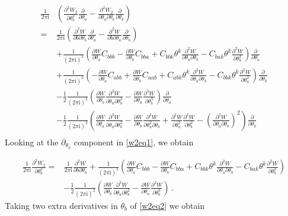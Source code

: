 \documentclass{article}
\theoremstyle{definition}
\numberwithin{equation}{section}
\begin{document}
\begin{equation}\label{w2eq1}
    \begin{split}
        \frac{1}{2\pi \mathrm{i}}&\left(\frac{\partial^2W_2}{\partial\theta_b^2}\frac{\partial}{\partial \theta_a}-\frac{\partial^2 W_2}{\partial \theta_a\partial\theta_b}\frac{\partial}{\partial \theta_b}\right)\\
        =&\frac{1}{2\pi \mathrm{i}}\left(\frac{\partial^2W}{\partial b\partial\theta_b}\frac{\partial}{\partial \theta_a}-\frac{\partial^2 W}{\partial b\partial \theta_a}\frac{\partial}{\partial \theta_b}\right)\\
        &+\frac{1}{(2\pi\mathrm{i})^2}\left(\frac{\partial W}{\partial \theta_a}C_{bbb}-\frac{\partial W}{\partial \theta_b}C_{bba}+C_{bbk}\theta^k\frac{\partial^2W}{\partial \theta_a\partial \theta_b}-C_{bak}\theta^k\frac{\partial^2W}{\partial \theta_b^2}\right)\frac{\partial}{\partial \theta_a}\\
        &+\frac{1}{(2\pi\mathrm{i})^2}\left(-\frac{\partial W}{\partial \theta_a}C_{abb}+\frac{\partial W}{\partial \theta_b}C_{aab}+C_{abk}\theta^k\frac{\partial^2W}{\partial \theta_a\partial \theta_b}-C_{bbk}\theta^k\frac{\partial^2W}{\partial \theta_a^2}\right)\frac{\partial}{\partial \theta_b}\\
        &-\frac{1}{2}\frac{1}{(2\pi\mathrm{i})^2}\left(\frac{\partial W}{\partial \theta_{b}}\frac{\partial^3 W}{\partial \theta_a \partial \theta_b^2}- \frac{\partial W}{\partial \theta_{a}}\frac{\partial^3 W}{ \partial \theta_b^3}\right)\frac{\partial}{\partial \theta_a}\\
    &-\frac{1}{2}\frac{1}{(2\pi\mathrm{i})^2}\left(\frac{\partial W}{\partial \theta_a}\frac{\partial^3W}{\partial \theta_a \partial \theta_b^2}- \frac{\partial W}{\partial \theta_b}\frac{\partial^3W}{\partial \theta_a^2 \partial \theta_b} + \frac{\partial^2W}{\partial \theta_a^2}\frac{\partial^2W}{\partial \theta_b^2}-\left(\frac{\partial^2W}{\partial \theta_a \partial \theta_b}\right)^2\right)\frac{\partial}{\partial \theta_b}\\
    \end{split}
\end{equation}
Looking at the $\partial_{\theta_a}$ component in \eqref{w2eq1}, we obtain

\begin{equation}\label{w2eq2}
    \begin{split}
        \frac{1}{2\pi \mathrm{i}}\frac{\partial^2 W_2}{\partial \theta_b^2}=&\frac{1}{2\pi \mathrm{i}}\frac{\partial^2 W}{\partial b \partial \theta_b}+\frac{1}{(2\pi\mathrm{i})^2}\left(\frac{\partial W}{\partial \theta_a}C_{bbb}-\frac{\partial W}{\partial \theta_b}C_{bba}+C_{bbk}\theta^k\frac{\partial^2W}{\partial \theta_a\partial \theta_b}-C_{bak}\theta^k\frac{\partial^2W}{\partial \theta_b^2}\right)\\
        &-\frac{1}{2}\frac{1}{(2\pi\mathrm{i})^2}\left(\frac{\partial W}{\partial \theta_{b}}\frac{\partial^3 W}{\partial \theta_a \partial \theta_b^2}- \frac{\partial W}{\partial \theta_{a}}\frac{\partial^3 W}{ \partial \theta_b^3}\right)\,.
    \end{split}
\end{equation}
Taking two extra derivatives in $\theta_b$ of \eqref{w2eq2} we obtain
\end{document}
